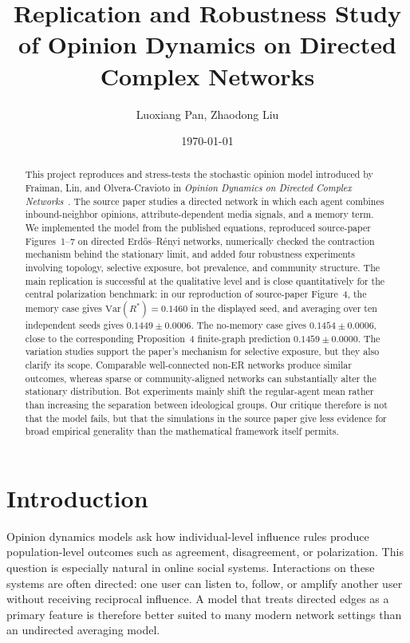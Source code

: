 \documentclass[11pt]{article}
\title{Replication and Robustness Study of Opinion Dynamics on Directed Complex Networks}
\author{Luoxiang Pan, Zhaodong Liu}
\date{\today}
\begin{document}
\maketitle

\begin{abstract}
This project reproduces and stress-tests the stochastic opinion model introduced
by Fraiman, Lin, and Olvera-Cravioto in \emph{Opinion Dynamics on Directed
Complex Networks}~\cite{fraiman2024opinion}.  The source paper studies a
directed network in which each agent combines inbound-neighbor opinions,
attribute-dependent media signals, and a memory term.  We implemented the model
from the published equations, reproduced source-paper Figures~1--7 on directed
Erd\H{o}s--R\'enyi networks, numerically checked the contraction mechanism
behind the stationary limit, and added four robustness experiments involving
topology, selective exposure, bot prevalence, and community structure.  The main
replication is successful at the qualitative level and is close quantitatively
for the central polarization benchmark: in our reproduction of source-paper
Figure~4, the memory case gives
$\mathrm{Var}(R^*)=0.1460$ in the displayed seed, and averaging over ten
independent seeds gives $0.1449\pm0.0006$.  The no-memory case gives
$0.1454\pm0.0006$, close to the corresponding Proposition~4 finite-graph
prediction $0.1459\pm0.0000$.  The variation studies
support the paper's mechanism for selective exposure, but they also clarify its
scope.  Comparable well-connected non-ER networks produce similar outcomes,
whereas sparse or community-aligned networks can substantially alter the
stationary distribution.  Bot experiments mainly shift the regular-agent mean
rather than increasing the separation between ideological groups.  Our critique
therefore is not that the model fails, but that the simulations in the source
paper give less evidence for broad empirical generality than the mathematical
framework itself permits.
\end{abstract}

\tableofcontents

\section{Introduction}

Opinion dynamics models ask how individual-level influence rules produce
population-level outcomes such as agreement, disagreement, or polarization.
This question is especially natural in online social systems.  Interactions on
these systems are often directed: one user can listen to, follow, or amplify
another user without receiving reciprocal influence.  A model that treats
directed edges as a primary feature is therefore better suited to many modern
network settings than an undirected averaging model.
\end{document}
